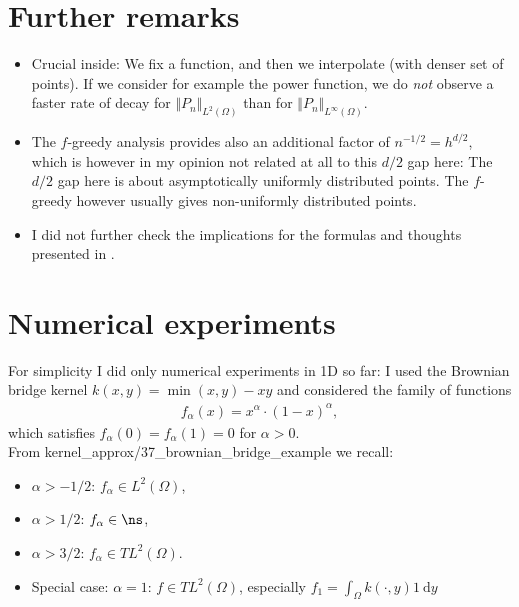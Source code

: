 \documentclass[a4paper, 10pt]{article}
\begin{document}
\section{Further remarks}

\begin{itemize}
\item Crucial inside: We fix a function, and then we interpolate (with denser set of points). 
If we consider for example the power function, we do \textit{not} observe a faster rate of decay for $\Vert P_n \Vert_{L^2(\Omega)}$ than for $\Vert P_n \Vert_{L^\infty(\Omega)}$.
\item The $f$-greedy analysis provides also an additional factor of $n^{-1/2} = h^{d/2}$, which is however in my opinion not related at all to this $d/2$ gap here:
The $d/2$ gap here is about asymptotically uniformly distributed points. 
The $f$-greedy however usually gives non-uniformly distributed points.
\item I did not further check the implications for the formulas and thoughts presented in \cite{karvonen2022error}.
\end{itemize}

\section{Numerical experiments}

For simplicity I did only numerical experiments in 1D so far: 
I used the Brownian bridge kernel $k(x, y) = \min(x, y) - xy$ and considered the family of functions
\begin{align*}
f_\alpha(x) = x^\alpha \cdot (1-x)^\alpha,
\end{align*}
which satisfies $f_\alpha(0) = f_\alpha(1) = 0$ for $\alpha > 0$. \\

\noindent From kernel\_approx/37\_brownian\_bridge\_example we recall:

\begin{itemize}
\item $\alpha > -1/2$: $f_\alpha \in L^2(\Omega)$, 
\item $\alpha > 1/2$: $f_\alpha \in \ns$, 
\item $\alpha > 3/2$: $f_\alpha \in TL^2(\Omega)$. 
\item Special case: $\alpha = 1$: $f \in TL^2(\Omega)$, especially $f_1 = \int_\Omega k(\cdot, y) 1 ~ \mathrm{d}y$
\end{itemize}
\end{document}
